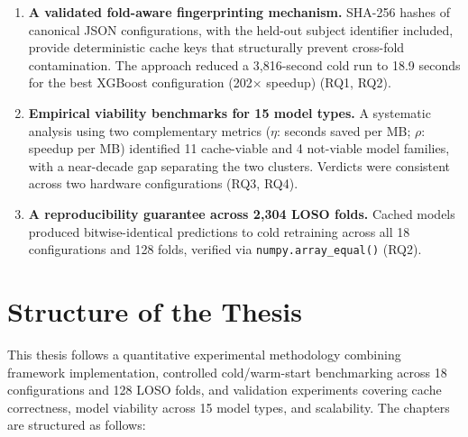\begin{enumerate}
\item \textbf{A validated fold-aware fingerprinting mechanism.} SHA-256 hashes
 of canonical JSON configurations, with the held-out subject identifier
 included, provide deterministic cache keys that structurally prevent
 cross-fold contamination. The approach reduced a 3{,}816-second cold run
 to 18.9 seconds for the best XGBoost configuration (202$\times$ speedup)
 (RQ1, RQ2).

\item \textbf{Empirical viability benchmarks for 15 model types.} A
 systematic analysis using two complementary metrics ($\eta$: seconds
 saved per MB; $\rho$: speedup per MB) identified 11 cache-viable and
 4 not-viable model families, with a near-decade gap separating the two
 clusters. Verdicts were consistent across two hardware configurations
 (RQ3, RQ4).

\item \textbf{A reproducibility guarantee across 2{,}304 LOSO folds.}
 Cached models produced bitwise-identical predictions to cold retraining
 across all 18 configurations and 128 folds, verified via
 \texttt{numpy.array\_equal()} (RQ2).
\end{enumerate}

\section{Structure of the Thesis}
This thesis follows a quantitative experimental methodology combining framework implementation, controlled cold/warm-start benchmarking across 18 configurations and 128 LOSO folds, and validation experiments covering cache correctness, model viability across 15 model types, and scalability. The chapters are structured as follows:

